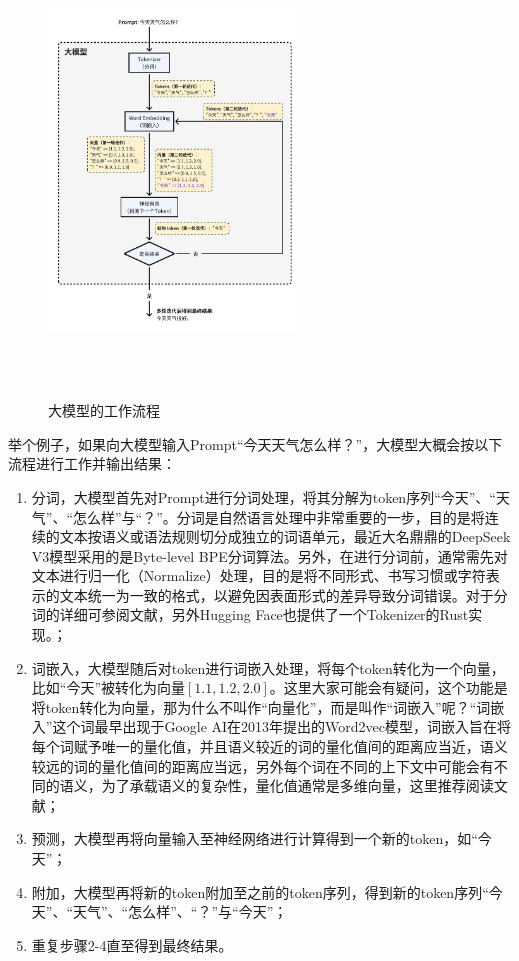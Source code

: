 \documentclass[letterpaper,11pt]{article}
\numberwithin{equation}{section}
\begin{document}
\begin{figure}[!htbp]
    \centering
    \includegraphics[width=0.6\textwidth, height=12cm, keepaspectratio]{../../assets/imgs/ai_share/llm_workflow.pdf}
    \caption{大模型的工作流程}
    \label{fig:llm-workflow}
\end{figure}

举个例子，如果向大模型输入Prompt“今天天气怎么样？”，大模型大概会按以下流程进行工作并输出结果：
\begin{enumerate}
    \item 分词，大模型首先对Prompt进行分词处理，将其分解为token序列“今天”、“天气”、“怎么样”与“？”。分词是自然语言处理中非常重要的一步，目的是将连续的文本按语义或语法规则切分成独立的词语单元，最近大名鼎鼎的DeepSeek V3模型采用的是Byte-level BPE分词算法\cite{shibata1999byte}。另外，在进行分词前，通常需先对文本进行归一化（Normalize）处理，目的是将不同形式、书写习惯或字符表示的文本统一为一致的格式，以避免因表面形式的差异导致分词错误。对于分词的详细可参阅文献\cite{glan2023tokenizer}，另外Hugging Face也提供了一个Tokenizer的Rust实现\cite{huggingface_tokenizers}。；
    \item 词嵌入，大模型随后对token进行词嵌入处理，将每个token转化为一个向量，比如“今天”被转化为向量$[1.1, 1.2, 2.0]$。这里大家可能会有疑问，这个功能是将token转化为向量，那为什么不叫作“向量化”，而是叫作“词嵌入”呢？“词嵌入”这个词最早出现于Google AI在2013年提出的Word2vec模型\cite{mikolov2013efficientestimationwordrepresentations}，词嵌入旨在将每个词赋予唯一的量化值，并且语义较近的词的量化值间的距离应当近，语义较远的词的量化值间的距离应当远，另外每个词在不同的上下文中可能会有不同的语义，为了承载语义的复杂性，量化值通常是多维向量，这里推荐阅读文献\cite{constantine2023wordembedding}；
    \item 预测，大模型再将向量输入至神经网络进行计算得到一个新的token，如“今天”；
    \item 附加，大模型再将新的token附加至之前的token序列，得到新的token序列“今天”、“天气”、“怎么样”、“？”与“今天”；
    \item 重复步骤2-4直至得到最终结果。
\end{enumerate}
\end{document}
